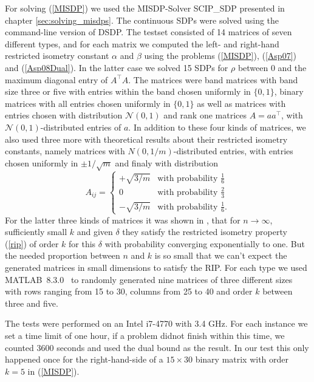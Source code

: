 \documentclass[journal]{IEEEtran}
\newcommand{\T}{^{\top}}
\begin{document}
For solving (\ref{MISDP}) we used the MISDP-Solver SCIP\_SDP presented in chapter \ref{sec:solving_misdps}. The continuous SDPs were solved using the command-line version of DSDP. The testset consisted of 14 matrices of seven 
different types, and for each matrix we computed the left- and right-hand restricted isometry constant $\alpha$ and $\beta$ using the problems (\ref{MISDP}), (\ref{Asp07}) and (\ref{Asp08Dual}). In the latter case we solved 15 
SDPs for $\rho$ between $0$ and the maximum diagonal entry of $A\T A$. The matrices were band matrices with band size three or five with entries within the band chosen uniformly in $\{0,1\}$, binary matrices with all entries chosen 
uniformly in $\{0,1\}$ as well as matrices with entries chosen with distribution $\mathcal{N}(0,1)$ and rank one matrices $A = aa\T$, with $\mathcal{N}(0,1)$-distributed entries of $a$. In addition to these four kinds of matrices, 
we also used three more with theoretical results about their restricted isometry constants, namely matrices with $N(0, 1/m)$-distributed entries, with entries chosen uniformly in $\pm 1/\sqrt{m}$ and finaly with distribution
\begin{equation}\nonumber
A_{ij} = \begin{cases} + \sqrt{3/m} & \text{with probability } \frac{1}{6} \\ 0 & \text{with probability } \frac{2}{3} \\ - \sqrt{3/m} & \text{with probability } \frac{1}{6}. \end{cases}
\end{equation}
For the latter three kinds of matrices it was shown in \cite{BDDW08}, that for $n \rightarrow \infty$, sufficiently small $k$ and given $\delta$ they satisfy the restricted isometry property (\ref{rip}) of order $k$ for this $\delta$
with probability converging exponentially to one. But the needed proportion between $n$ and $k$ is so small that we can't expect the generated matrices in small dimensions to satisfy the RIP. For each type we used \mbox{MATLAB 8.3.0 
\cite{MAT}} to randomly generated nine matrices of three different sizes with rows ranging from 15 to 30, columns from 25 to 40 and order $k$ between three and five.

The tests were performed on an Intel i7-4770 with 3.4 GHz. For each instance we set a time limit of one hour, if a problem didnot finish within this time, we counted 3600 seconds and used the dual bound as the result. In our test this
only happened once for the right-hand-side of a $15 \times 30$ binary matrix with order $k=5$ in (\ref{MISDP}). 
\end{document}
